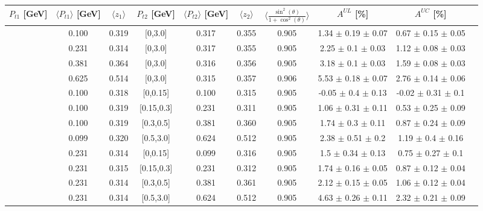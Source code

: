 \begin{table}[H]\tiny
\centering
\renewcommand{\arraystretch}{1.5}
\begin{tabular}{|c| c| c| c| c| c| c| c| c| c|}
\hline
$P_{t1}$  [GeV]  & $\langle  P_{t1} \rangle$  [GeV]  & $\langle  z_{1}  \rangle$ & $P_{t2}$  [GeV] &  $\langle  P_{t2}\rangle$  [GeV]  & $\langle  z_{2}\rangle$ &$\langle\frac{\sin^2(\theta)}{1+\cos^2(\theta)}\rangle$ &$A^{UL}$ [\%] &  $A^{UC}$ [\%]   \\ \hline
[0,0.15]	&	0.100	&	0.319	&	[0,3.0]	&	0.317	&	0.355	&	0.905	& 1.34  $\pm$ 0.19  $\pm$ 0.07 & 0.67  $\pm$ 0.15  $\pm$ 0.05 \\ \hline
[0.15,0.3]	&	0.231	&	0.314	&	[0,3.0]	&	0.317	&	0.355	&	0.905	& 2.25  $\pm$ 0.1  $\pm$ 0.03  & 1.12  $\pm$ 0.08  $\pm$ 0.03 \\ \hline
[0.3,0.5]	&	0.381	&	0.364	&	[0,3.0]	&	0.316	&	0.356	&	0.905	& 3.18  $\pm$ 0.1  $\pm$ 0.03  & 1.59  $\pm$ 0.08  $\pm$ 0.03 \\ \hline
[0.5,3.0]	&	0.625	&	0.514	&	[0,3.0]	&	0.315	&	0.357	&	0.906	& 5.53  $\pm$ 0.18  $\pm$ 0.07 & 2.76  $\pm$ 0.14  $\pm$ 0.06 \\ \hline
\hline
[0,0.15]	&	0.100	&	0.318	&	[0,0.15]	&	0.100	&	0.315	&	0.905	&-0.05  $\pm$ 0.4  $\pm$ 0.13  & -0.02  $\pm$ 0.31  $\pm$ 0.1 \\ \hline
[0,0.15]	&	0.100	&	0.319	&	[0.15,0.3]	&	0.231	&	0.311	&	0.905	&1.06  $\pm$ 0.31  $\pm$ 0.11  & 0.53  $\pm$ 0.25  $\pm$ 0.09 \\ \hline
[0,0.15]	&	0.100	&	0.319	&	[0.3,0.5]	&	0.381	&	0.360	&	0.905	&1.74  $\pm$ 0.3  $\pm$ 0.11   & 0.87  $\pm$ 0.24  $\pm$ 0.09 \\ \hline
[0,0.15]	&	0.099	&	0.320	&	[0.5,3.0]	&	0.624	&	0.512	&	0.905	&2.38  $\pm$ 0.51  $\pm$ 0.2   & 1.19  $\pm$ 0.4  $\pm$ 0.16  \\ \hline
\hline
[0.15,0.3]	&	0.231	&	0.314	&	[0,0.15]	&	0.099	&	0.316	&	0.905	&1.5  $\pm$ 0.34  $\pm$ 0.13   & 0.75  $\pm$ 0.27  $\pm$ 0.1  \\ \hline
[0.15,0.3]	&	0.231	&	0.315	&	[0.15,0.3]	&	0.231	&	0.312	&	0.905	&1.74  $\pm$ 0.16  $\pm$ 0.05  & 0.87  $\pm$ 0.12  $\pm$ 0.04 \\ \hline
[0.15,0.3]	&	0.231	&	0.314	&	[0.3,0.5]	&	0.381	&	0.361	&	0.905	&2.12  $\pm$ 0.15  $\pm$ 0.05  & 1.06  $\pm$ 0.12  $\pm$ 0.04 \\ \hline
[0.15,0.3]	&	0.231	&	0.314	&	[0.5,3.0]	&	0.624	&	0.512	&	0.905	&4.63  $\pm$ 0.26  $\pm$ 0.11  & 2.32  $\pm$ 0.21  $\pm$ 0.09 \\ \hline
\hline

\end{tabular}
\end{table}
